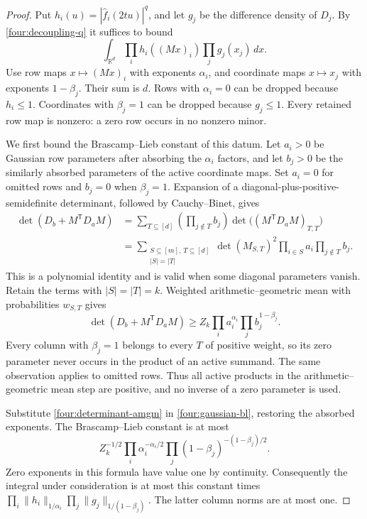 \begin{proof}
Put \(h_i(u)=|\widehat f_i(2tu)|^q\), and let \(g_j\) be the
difference density of \(D_j\).  By \eqref{four:decoupling-q} it
suffices to bound
\[
 \int_{\mathbb R^d}
        \prod_i h_i((Mx)_i)\prod_jg_j(x_j)\,dx.
\]
Use row maps \(x\mapsto(Mx)_i\) with exponents \(\alpha_i\),
and coordinate maps \(x\mapsto x_j\) with exponents
\(1-\beta_j\).  Their sum is \(d\).  Rows with \(\alpha_i=0\)
can be dropped because \(h_i\leq1\).  Coordinates with
\(\beta_j=1\) can be dropped because \(g_j\leq1\).
Every retained row map is nonzero: a zero row occurs in no
nonzero minor.

We first bound the Brascamp--Lieb constant of this datum.  Let
\(a_i>0\) be Gaussian row parameters after absorbing the
\(\alpha_i\) factors, and let \(b_j>0\) be the similarly absorbed
parameters of the active coordinate maps.  Set \(a_i=0\) for
omitted rows and \(b_j=0\) when \(\beta_j=1\).
Expansion of a diagonal-plus-positive-semidefinite determinant,
followed by Cauchy--Binet, gives
\begin{align}
 \det(D_b+M^{\mathsf T}D_aM)
 &=\sum_{T\subseteq[d]}
       \left(\prod_{j\notin T}b_j\right)
       \det\big((M^{\mathsf T}D_aM)_{T,T}\big)
 \nonumber\\
 &=\sum_{\substack{S\subseteq[m],\,T\subseteq[d]\\|S|=|T|}}
       \det(M_{S,T})^2
       \prod_{i\in S}a_i\prod_{j\notin T}b_j .
 \label{four:determinant-expansion}
\end{align}
This is a polynomial identity and is valid when some diagonal
parameters vanish.  Retain the terms with \(|S|=|T|=k\).
Weighted arithmetic--geometric mean with probabilities
\(w_{S,T}\) gives
\begin{equation}\label{four:determinant-amgm}
 \det(D_b+M^{\mathsf T}D_aM)
 \geq Z_k\prod_i a_i^{\alpha_i}
                    \prod_j b_j^{1-\beta_j}.
\end{equation}
Every column with \(\beta_j=1\) belongs to every \(T\) of positive
weight, so its zero parameter never occurs in the product of an
active summand.  The same observation applies to omitted rows.
Thus all active products in the arithmetic--geometric mean step
are positive, and no inverse of a zero parameter is used.

Substitute \eqref{four:determinant-amgm} in
\eqref{four:gaussian-bl}, restoring the absorbed exponents.
The Brascamp--Lieb constant is at most
\begin{equation}\label{four:volume-bl-constant}
 Z_k^{-1/2}\prod_i\alpha_i^{-\alpha_i/2}
                 \prod_j(1-\beta_j)^{-(1-\beta_j)/2}.
\end{equation}
Zero exponents in this formula have value one by continuity.
Consequently the integral under consideration is at most this
constant times
\(\prod_i\|h_i\|_{1/\alpha_i}
  \prod_j\|g_j\|_{1/(1-\beta_j)}\).
The latter column norms are at most one.


\end{proof}
